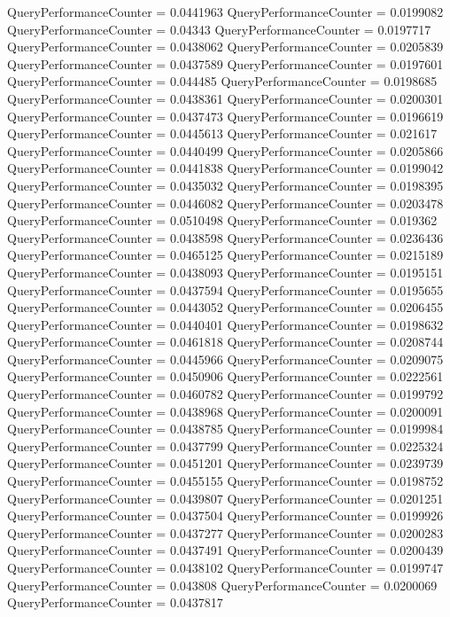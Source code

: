 \documentclass[9pt]{article}
\theoremstyle{plain}
\theoremstyle{definition}
\theoremstyle{remark}
\numberwithin{equation}{section}
\begin{document}
QueryPerformanceCounter  =  0.0441963
QueryPerformanceCounter  =  0.0199082
QueryPerformanceCounter  =  0.04343
QueryPerformanceCounter  =  0.0197717
QueryPerformanceCounter  =  0.0438062
QueryPerformanceCounter  =  0.0205839
QueryPerformanceCounter  =  0.0437589
QueryPerformanceCounter  =  0.0197601
QueryPerformanceCounter  =  0.044485
QueryPerformanceCounter  =  0.0198685
QueryPerformanceCounter  =  0.0438361
QueryPerformanceCounter  =  0.0200301
QueryPerformanceCounter  =  0.0437473
QueryPerformanceCounter  =  0.0196619
QueryPerformanceCounter  =  0.0445613
QueryPerformanceCounter  =  0.021617
QueryPerformanceCounter  =  0.0440499
QueryPerformanceCounter  =  0.0205866
QueryPerformanceCounter  =  0.0441838
QueryPerformanceCounter  =  0.0199042
QueryPerformanceCounter  =  0.0435032
QueryPerformanceCounter  =  0.0198395
QueryPerformanceCounter  =  0.0446082
QueryPerformanceCounter  =  0.0203478
QueryPerformanceCounter  =  0.0510498
QueryPerformanceCounter  =  0.019362
QueryPerformanceCounter  =  0.0438598
QueryPerformanceCounter  =  0.0236436
QueryPerformanceCounter  =  0.0465125
QueryPerformanceCounter  =  0.0215189
QueryPerformanceCounter  =  0.0438093
QueryPerformanceCounter  =  0.0195151
QueryPerformanceCounter  =  0.0437594
QueryPerformanceCounter  =  0.0195655
QueryPerformanceCounter  =  0.0443052
QueryPerformanceCounter  =  0.0206455
QueryPerformanceCounter  =  0.0440401
QueryPerformanceCounter  =  0.0198632
QueryPerformanceCounter  =  0.0461818
QueryPerformanceCounter  =  0.0208744
QueryPerformanceCounter  =  0.0445966
QueryPerformanceCounter  =  0.0209075
QueryPerformanceCounter  =  0.0450906
QueryPerformanceCounter  =  0.0222561
QueryPerformanceCounter  =  0.0460782
QueryPerformanceCounter  =  0.0199792
QueryPerformanceCounter  =  0.0438968
QueryPerformanceCounter  =  0.0200091
QueryPerformanceCounter  =  0.0438785
QueryPerformanceCounter  =  0.0199984
QueryPerformanceCounter  =  0.0437799
QueryPerformanceCounter  =  0.0225324
QueryPerformanceCounter  =  0.0451201
QueryPerformanceCounter  =  0.0239739
QueryPerformanceCounter  =  0.0455155
QueryPerformanceCounter  =  0.0198752
QueryPerformanceCounter  =  0.0439807
QueryPerformanceCounter  =  0.0201251
QueryPerformanceCounter  =  0.0437504
QueryPerformanceCounter  =  0.0199926
QueryPerformanceCounter  =  0.0437277
QueryPerformanceCounter  =  0.0200283
QueryPerformanceCounter  =  0.0437491
QueryPerformanceCounter  =  0.0200439
QueryPerformanceCounter  =  0.0438102
QueryPerformanceCounter  =  0.0199747
QueryPerformanceCounter  =  0.043808
QueryPerformanceCounter  =  0.0200069
QueryPerformanceCounter  =  0.0437817
\end{document}
